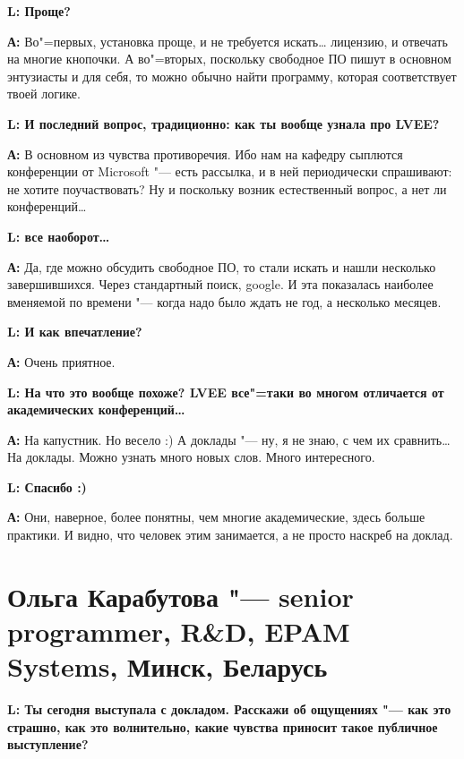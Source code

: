 \documentclass[10pt, a5paper]{article}
\begin{document}
{\noindent \bf L: Проще?}

{\noindent \bf А:} Во"=первых, установка проще, и не требуется искать\ldots{} лицензию, и отвечать на многие кнопочки. А во"=вторых, поскольку свободное ПО пишут в основном энтузиасты и для себя, то можно обычно найти программу, которая соответствует твоей логике.

{\noindent \bf L: И последний вопрос, традиционно: как ты вообще узнала про LVEE?}

{\noindent \bf А:} В основном из чувства противоречия. Ибо нам на кафедру сыплются конференции от Microsoft "--- есть рассылка, и в ней периодически спрашивают: не хотите поучаствовать? Ну и поскольку возник естественный вопрос, а нет ли конференций\ldots

{\noindent \bf L:  все наоборот\ldots}

{\noindent \bf А:} Да, где можно обсудить свободное ПО, то стали искать и нашли несколько завершившихся. Через стандартный поиск, google. И эта показалась наиболее вменяемой по времени "--- когда надо было ждать не год, а несколько месяцев. 

{\noindent \bf L: И как впечатление?}

{\noindent \bf А:} Очень приятное.

{\noindent \bf L: На что это вообще похоже? LVEE все"=таки во многом отличается от академических конференций\ldots}

{\noindent \bf А:} На капустник. Но весело :) А доклады "--- ну, я не знаю, с чем их сравнить\ldots На доклады. Можно узнать много новых слов. Много интересного. 

{\noindent \bf L: Спасибо :)}

{\noindent \bf А:} Они, наверное, более понятны, чем многие академические, здесь больше практики. И видно, что человек этим занимается, а не просто наскреб на доклад. 

\section{Ольга Карабутова "--- senior programmer, R\&D, EPAM Systems, Минск, Беларусь}


{\noindent \bf L: Ты сегодня выступала с докладом. Расскажи об ощущениях "--- как это страшно, как это волнительно, какие чувства приносит такое публичное выступление?}
\end{document}
